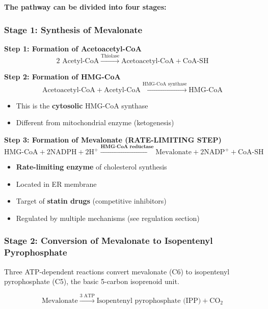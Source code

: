\textbf{The pathway can be divided into four stages:}

\subsubsection{Stage 1: Synthesis of Mevalonate}

\textbf{Step 1: Formation of Acetoacetyl-CoA}
\[
2 \text{ Acetyl-CoA} \xrightarrow{\text{Thiolase}} \text{Acetoacetyl-CoA} + \text{CoA-SH}
\]

\textbf{Step 2: Formation of HMG-CoA}
\[
\text{Acetoacetyl-CoA} + \text{Acetyl-CoA} \xrightarrow{\text{HMG-CoA synthase}} \text{HMG-CoA}
\]
\begin{itemize}
    \item This is the \textbf{cytosolic} HMG-CoA synthase
    \item Different from mitochondrial enzyme (ketogenesis)
\end{itemize}

\textbf{Step 3: Formation of Mevalonate (RATE-LIMITING STEP)}
\[
\text{HMG-CoA} + 2\text{NADPH} + 2\text{H}^+ \xrightarrow{\textbf{HMG-CoA reductase}} \text{Mevalonate} + 2\text{NADP}^+ + \text{CoA-SH}
\]

\begin{tcolorbox}[colback=yellow!10, colframe=yellow!70!black, title=\textbf{HMG-CoA Reductase: Key Regulatory Enzyme}]
\begin{itemize}
    \item \textbf{Rate-limiting enzyme} of cholesterol synthesis
    \item Located in ER membrane
    \item Target of \textbf{statin drugs} (competitive inhibitors)
    \item Regulated by multiple mechanisms (see regulation section)
\end{itemize}
\end{tcolorbox}

\subsubsection{Stage 2: Conversion of Mevalonate to Isopentenyl Pyrophosphate}

Three ATP-dependent reactions convert mevalonate (C6) to isopentenyl pyrophosphate (C5), the basic 5-carbon isoprenoid unit.

\[
\text{Mevalonate} \xrightarrow{3 \text{ ATP}} \text{Isopentenyl pyrophosphate (IPP)} + \text{CO}_2
\]

